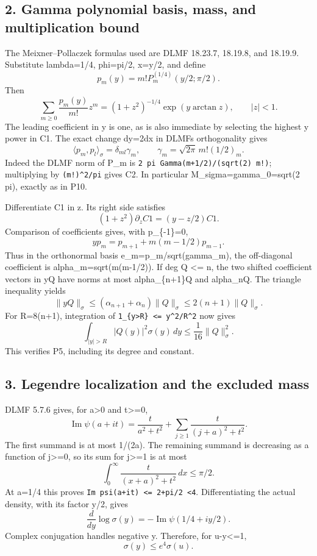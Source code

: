 \subsection{2. Gamma polynomial basis, mass, and multiplication bound}\label{mrcoerc:gamma-polynomial-basis-mass-and-multiplication-bound}

The Meixner--Pollaczek formulas used are DLMF 18.23.7, 18.19.8, and 18.19.9. Substitute lambda=1/4, phi=pi/2, x=y/2, and define \[
p_m(y)=m!P_m^{(1/4)}(y/2;\pi/2).
\] Then \[
\sum_{m\ge0}\frac{p_m(y)}{m!}z^m
 =(1+z^2)^{-1/4}\exp(y\arctan z),\qquad |z|<1.
\tag{C1}
\] The leading coefficient in y is one, as is also immediate by selecting the highest y power in C1. The exact change dy=2dx in DLMF\textquotesingle s orthogonality gives \[
\langle p_m,p_l\rangle_\sigma=\delta_{ml}\gamma_m,
\qquad
\gamma_m=\sqrt{2\pi}\,m!(1/2)_m.
\tag{C2}
\] Indeed the DLMF norm of P\_m is \texttt{2\ pi\ Gamma(m+1/2)/(sqrt(2)\ m!)}; multiplying by \texttt{(m!)\^{}2/pi} gives C2. In particular M\_sigma=gamma\_0=sqrt(2 pi), exactly as in P10.

Differentiate C1 in z. Its right side satisfies \[
(1+z^2)\partial_z C1=(y-z/2)C1.
\] Comparison of coefficients gives, with p\_\{-1\}=0, \[
yp_m=p_{m+1}+m(m-1/2)p_{m-1}.
\tag{C3}
\] Thus in the orthonormal basis e\_m=p\_m/sqrt(gamma\_m), the off-diagonal coefficient is alpha\_m=sqrt(m(m-1/2)). If deg Q \textless= n, the two shifted coefficient vectors in yQ have norms at most alpha\_\{n+1\}\textbar\textbar Q\textbar\textbar{} and alpha\_n\textbar\textbar Q\textbar\textbar. The triangle inequality yields \[
\|yQ\|_\sigma\le(\alpha_{n+1}+\alpha_n)\|Q\|_\sigma
 \le2(n+1)\|Q\|_\sigma.
\tag{C4}
\] For R=8(n+1), integration of \texttt{1\_\{\textbar{}y\textbar{}\textgreater{}R\}\ \textless{}=\ y\^{}2/R\^{}2} now gives \[
\int_{|y|>R}|Q(y)|^2\sigma(y)\,dy\le\frac1{16}\|Q\|_\sigma^2.
\tag{C5}
\] This verifies P5, including its degree and constant.

\subsection{3. Legendre localization and the excluded mass}\label{mrcoerc:legendre-localization-and-the-excluded-mass}

DLMF 5.7.6 gives, for a\textgreater0 and t\textgreater=0, \[
\operatorname{Im}\psi(a+it)=\frac{t}{a^2+t^2}
 +\sum_{j\ge1}\frac{t}{(j+a)^2+t^2}.
\] The first summand is at most 1/(2a). The remaining summand is decreasing as a function of j\textgreater=0, so its sum for j\textgreater=1 is at most \[
\int_0^\infty\frac{t}{(x+a)^2+t^2}\,dx\le\pi/2.
\] At a=1/4 this proves \texttt{\textbar{}Im\ psi(a+it)\textbar{}\ \textless{}=\ 2+pi/2\ \textless{}4}. Differentiating the actual density, with its factor y/2, gives \[
\frac d{dy}\log\sigma(y)=-\operatorname{Im}\psi(1/4+iy/2).
\] Complex conjugation handles negative y. Therefore, for \textbar u-y\textbar\textless=1, \[
\sigma(y)\le e^4\sigma(u).
\tag{C6}
\]

